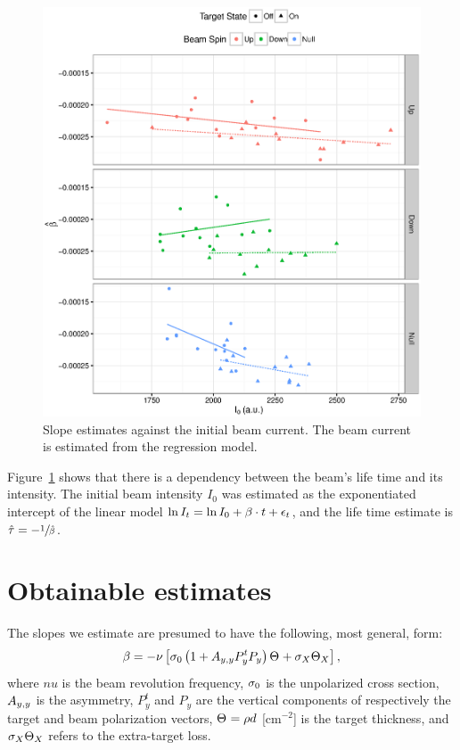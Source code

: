 \documentclass{article}
\begin{document}
\begin{figure}[h]
\begin{minipage}[t]{.5\textwidth}
	\end{minipage}~~~~%
	\begin{minipage}[t]{.5\textwidth}
		\centering
			\includegraphics[scale=.5]{Slope_VS_IniCurrent_2016.eps}
			\caption{Slope estimates against the initial beam current. The beam current is estimated from the regression model.\label{fig:Slp_VS_I0}}
	\end{minipage}

\end{figure}

Figure~\ref{fig:Slp_VS_I0} shows that there is a dependency between the beam's life time and its intensity. The initial beam intensity $I_0$ was estimated as the exponentiated intercept of the linear model $\ln I_t = \ln I_0 + \slp\cdot t + \err_t$, and the life time estimate is $\hat{\tau} = -\sfrac{1}{\slp*}$. 

\section{Obtainable estimates}

The slopes we estimate are presumed to have the following, most general, form:
\begin{equation}
	\slp = -\nu\bkt*{\CS[0]\bkt{1 + \Ayy P^t_y P_y}\Thick + \CS[X]\Thick[X]},
\end{equation}
where $nu$ is the beam revolution frequency, $\CS[0]$ is the unpolarized cross section, $\Ayy$ is the asymmetry, $P^t_y$ and $P_y$ are the vertical components of respectively the target and beam polarization vectors, $\Thick = \rho d$ [cm$^{-2}$] is the target thickness, and $\CS[X]\Thick[X]$ refers to the extra-target loss.
\end{document}

